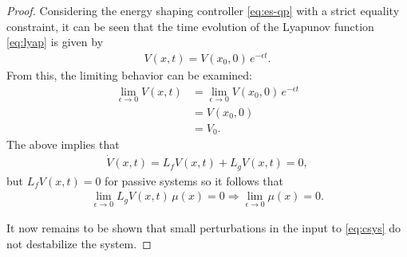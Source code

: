 \documentclass[twocolumn]{article}
\newcommand{\limeps}{\lim_{\epsilon \to 0}}
\begin{document}
\begin{proof}
  Considering the energy shaping controller \eqref{eq:es-qp} with a strict equality constraint, it can be seen that the time evolution of the Lyapunov function \eqref{eq:lyap} is given by
  \begin{align*}
    V(x, t) = V(x_{0}, 0) \, e^{-\epsilon t}.
  \end{align*}
  From this, the limiting behavior can be examined:
  \begin{align*}
    \limeps V(x, t) &= \limeps V(x_{0}, 0) \, e^{-\epsilon t}\\
    &= V(x_{0}, 0)\\
    &= V_0.
  \end{align*}
  The above implies that
  \begin{align*}
    {\dot V}(x, t) = L_{f} V(x, t) + L_{g} V(x, t) = 0,
  \end{align*}
  but $L_{f} V(x, t) = 0$ for passive systems so it follows that
  \begin{align*}
    \limeps L_{g} V(x, t) \, \mu(x) = 0 \Rightarrow \limeps \mu(x) = 0.
  \end{align*}

  It now remains to be shown that small perturbations in the input to \eqref{eq:csys} do not destabilize the system.
\end{proof}
\end{document}
